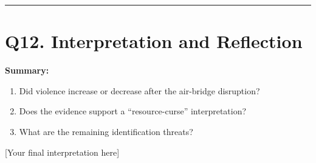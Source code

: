 \documentclass[
]{article}
\providecommand{\tightlist}{%
  \setlength{\itemsep}{0pt}\setlength{\parskip}{0pt}}
\begin{document}
\begin{center}\rule{0.5\linewidth}{0.5pt}\end{center}

\section{Q12. Interpretation and
Reflection}\label{q12.-interpretation-and-reflection}

\textbf{Summary:}

\begin{enumerate}
\def\labelenumi{\arabic{enumi}.}
\tightlist
\item
  Did violence increase or decrease after the air-bridge disruption?
\item
  Does the evidence support a ``resource-curse'' interpretation?
\item
  What are the remaining identification threats?
\end{enumerate}

{[}Your final interpretation here{]}
\end{document}
